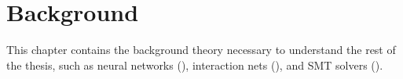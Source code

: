 \chapter{Background}
\label{ch:background}

This chapter contains the background theory necessary to understand the rest of the thesis, such as
neural networks (\textbf{}), interaction nets
(\textbf{}), and SMT solvers (\textbf{}).






